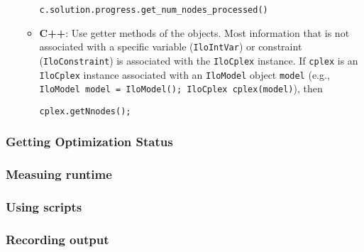 \documentclass[12pt]{article}
\begin{document}
\begin{itemize}
\begin{itemize}
\begin{verbatim}
c.solution.progress.get_num_nodes_processed()
\end{verbatim}
            \item \textbf{C++}: Use getter methods of the objects. Most information that is not associated with a specific variable (\texttt{IloIntVar}) or constraint (\texttt{IloConstraint}) is associated with the \texttt{IloCplex} instance. If \texttt{cplex} is an \texttt{IloCplex} instance associated with an \texttt{IloModel} object \texttt{model} (e.g., \texttt{IloModel model = IloModel(); IloCplex cplex(model)}), then
\begin{verbatim}
cplex.getNnodes();
\end{verbatim}
        \end{itemize}
\end{itemize}

\subsubsection{Getting Optimization Status}


\subsubsection{Measuing runtime}
\subsubsection{Using scripts}
\subsubsection{Recording output}

\printbibliography
\end{document}

